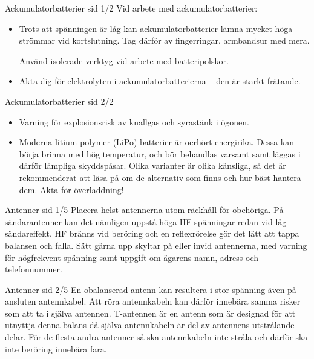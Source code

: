\documentclass{beamer}
\begin{document}
\begin{frame}{Ackumulatorbatterier sid 1/2}
Vid arbete med ackumulatorbatterier:

\begin{itemize}
	\item Trots att spänningen är låg kan ackumulatorbatterier lämna
	mycket höga strömmar vid kortslutning.
	Tag därför av fingerringar, armbandsur med mera.
	
	Använd isolerade verktyg vid arbete med batteripolskor.
	\item Akta dig för elektrolyten i ackumulatorbatterierna -- den är
	starkt frätande.
\end{itemize}
\end{frame}

\begin{frame}{Ackumulatorbatterier sid 2/2}
\begin{itemize}
	\item Varning för explosionsrisk av knallgas och syrastänk i ögonen.
	\item Moderna litium-polymer (LiPo) batterier är oerhört energirika.
	Dessa kan börja brinna med hög temperatur, och bör behandlas varsamt samt
	läggas i därför lämpliga skyddspåsar.
	Olika varianter är olika känsliga, så det är rekommenderat att läsa på om
	de alternativ som finns och hur bäst hantera dem.
	Akta för överladdning!
\end{itemize}
\end{frame}

\begin{frame}{Antenner sid 1/5}
Placera helst antennerna utom räckhåll för obehöriga.
På sändarantenner kan det nämligen uppstå höga HF-spänningar redan vid
låg sändareffekt.
HF bränns vid beröring och en reflexrörelse gör det lätt att tappa balansen och
falla.
Sätt gärna upp skyltar på eller invid antennerna, med varning för högfrekvent
spänning samt uppgift om ägarens namn, adress och telefonnummer.
\end{frame}

\begin{frame}{Antenner sid 2/5}
En obalanserad antenn kan resultera i stor spänning även på ansluten
antennkabel.
Att röra antennkabeln kan därför innebära samma risker som att ta i själva
antennen.
T-antennen är en antenn som är designad för att utnyttja denna balans då själva
antennkabeln är del av antennens utstrålande delar.
För de flesta andra antenner så ska antennkabeln inte stråla och därför ska inte
beröring innebära fara.
\end{frame}
\end{document}
